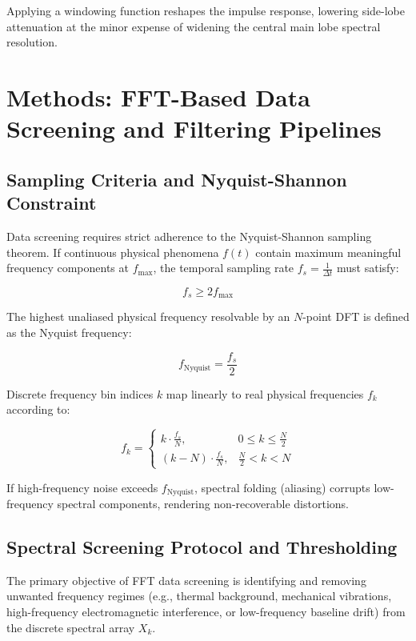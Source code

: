 \documentclass[11pt,a4paper]{article}
\begin{document}
Applying a windowing function reshapes the impulse response, lowering side-lobe attenuation at the minor expense of widening the central main lobe spectral resolution.

\section{Methods: FFT-Based Data Screening and Filtering Pipelines}

\subsection{Sampling Criteria and Nyquist-Shannon Constraint}

Data screening requires strict adherence to the Nyquist-Shannon sampling theorem. If continuous physical phenomena $f(t)$ contain maximum meaningful frequency components at $f_{\max}$, the temporal sampling rate $f_s = \frac{1}{\Delta t}$ must satisfy:

\begin{equation}
f_s \ge 2 f_{\max}
\end{equation}

The highest unaliased physical frequency resolvable by an $N$-point DFT is defined as the Nyquist frequency:

\begin{equation}
f_{\text{Nyquist}} = \frac{f_s}{2}
\end{equation}

Discrete frequency bin indices $k$ map linearly to real physical frequencies $f_k$ according to:

\begin{equation}
f_k = \begin{cases} 
k \cdot \frac{f_s}{N}, & 0 \le k \le \frac{N}{2} \\
(k - N) \cdot \frac{f_s}{N}, & \frac{N}{2} < k < N 
\end{cases}
\end{equation}

If high-frequency noise exceeds $f_{\text{Nyquist}}$, spectral folding (aliasing) corrupts low-frequency spectral components, rendering non-recoverable distortions.

\subsection{Spectral Screening Protocol and Thresholding}

The primary objective of FFT data screening is identifying and removing unwanted frequency regimes (e.g., thermal background, mechanical vibrations, high-frequency electromagnetic interference, or low-frequency baseline drift) from the discrete spectral array $X_k$.
\end{document}
